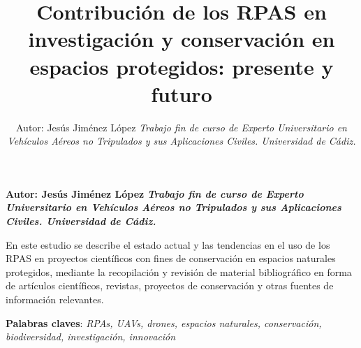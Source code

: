 \documentclass[onecolumn]{extarticle}
\title{Contribución de los RPAS en investigación y conservación en espacios
protegidos: presente y futuro\vspace{0.25in}  }
\author{\Large Autor: Jesús Jiménez López\vspace{0.05in} \newline\normalsize\emph{Trabajo fin de curso de Experto Universitario en Vehículos Aéreos no
Tripulados y sus Aplicaciones Civiles. Universidad de Cádiz.}  }
\date{}
\newcommand*{\authorfont}{\fontfamily{phv}\selectfont}
\renewenvironment{abstract}
 {{%
    \setlength{\leftmargin}{0mm}
    \setlength{\rightmargin}{\leftmargin}%
  }%
  \relax}
 {\endlist}
\begin{document}
	
%

{%

\setlength{\parindent}{0pt}
\thispagestyle{plain}

{\fontsize{16}{20}\selectfont\raggedright 
\maketitle  %

}

 
{
   \vskip 13.5pt\relax \normalsize\fontsize{8}{10} 
 \textbf{\authorfont Autor: Jesús Jiménez López} \hskip 10pt \vskip 5pt  \bf\emph{\small Trabajo fin de curso de Experto Universitario en Vehículos Aéreos no
Tripulados y sus Aplicaciones Civiles. Universidad de Cádiz.}   

}

}







\begin{abstract}

    \hbox{\vrule height .2pt width 19.10pc}

    \vskip 6pt %

\noindent En este estudio se describe el estado actual y las tendencias en el uso
de los RPAS en proyectos científicos con fines de conservación en
espacios naturales protegidos, mediante la recopilación y revisión de
material bibliográfico en forma de artículos científicos, revistas,
proyectos de conservación y otras fuentes de información relevantes.


\vskip 8pt \noindent \textbf{Palabras claves}: \emph{RPAs, UAVs, drones, espacios naturales, conservación, biodiversidad,
investigación, innovación} \par

    \hbox{\vrule height .2pt width 19.10pc}



\end{abstract}


{
\fontsize{8}{10} 
\hypersetup{linkcolor=black}
\setcounter{tocdepth}{2}
\tableofcontents
}


\vskip 6.5pt
\end{document}
